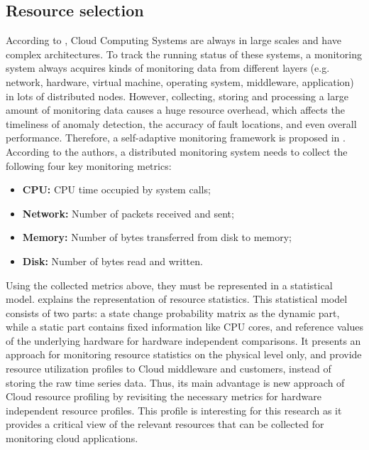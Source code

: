 \subsection{Resource selection} \label{sec:resource_selection}
According to \cite{wang2018self}, Cloud Computing Systems are always in large scales and have complex architectures. To track the running status of these systems, a monitoring system always acquires kinds of monitoring data from different layers (e.g. network, hardware, virtual machine, operating system, middleware, application) in lots of distributed nodes. However, collecting, storing and processing a large amount of monitoring data causes a huge resource overhead, which affects the timeliness of anomaly detection, the accuracy of fault locations, and even overall performance. Therefore, a self-adaptive monitoring framework is proposed in \cite{wang2018self}. According to the authors, a distributed monitoring system needs to collect the following four key monitoring metrics:
\begin{itemize}
    \item \textbf{CPU: }CPU time occupied by system calls;
    \item \textbf{Network: }Number of packets received and sent;
    \item \textbf{Memory: }Number of bytes transferred from disk to memory;
    \item \textbf{Disk: }Number of bytes read and written.
\end{itemize}

\noindent
Using the collected metrics above, they must be represented in a statistical model. \cite{hauser2018reviewing} explains the representation of resource statistics. This statistical model consists of two parts: a state change probability matrix as the dynamic part, while a static part contains fixed information like CPU cores, and reference values of the underlying hardware for hardware independent comparisons. It presents an approach for monitoring resource statistics on the physical level only, and provide resource utilization profiles to Cloud middleware and customers, instead of storing the raw time series data. Thus, its main advantage is new approach of Cloud resource profiling by revisiting the necessary metrics for hardware independent resource profiles. This profile is interesting for this research as it provides a critical view of the relevant resources that can be collected for monitoring cloud applications.\\



